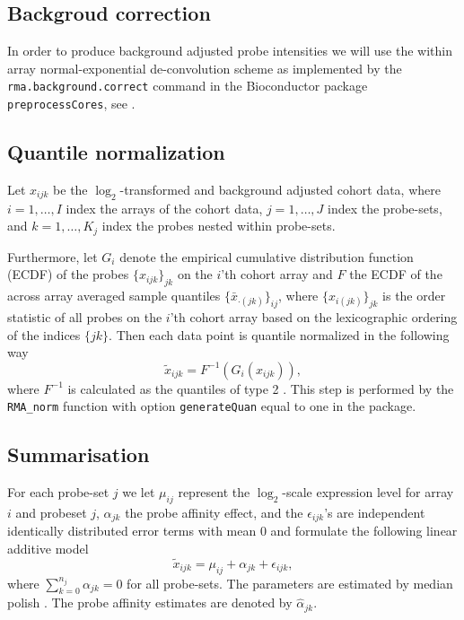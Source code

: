 \subsection{Backgroud correction}
In order to produce background adjusted probe intensities we will use the within array normal-exponential de-convolution scheme as implemented by the \texttt{rma.background.correct} command in the Bioconductor package \texttt{preprocessCores}, see
\citep{Irizarry2003b,Bolstad2004}.


\subsection{Quantile normalization}
Let $x_{ijk}$ be the $\log_2$-transformed and background adjusted cohort data, where $i = 1,\dots,I$ index the arrays of the cohort data, $j=1,\dots,J$  index the probe-sets, and $k=1,\dots,K_j$ index the probes nested within probe-sets.

Furthermore, let $G_i$ denote the empirical cumulative distribution function (ECDF) of the probes $\{x_{ijk}\}_{jk}$ on the $i$'th cohort array and $F$ the ECDF of the across array averaged sample quantiles $\{\bar{x}_{\cdot (jk)}\}_{ij}$, where $\{x_{i(jk)}\}_{jk}$ is the order statistic of all probes on the $i$'th cohort array based on the lexicographic ordering of the indices $\{jk\}$. Then each data point is quantile normalized in the following way
\begin{equation*}
     \tilde{x}_{ijk} = F^{-1}(G_i(x_{ijk})),
\end{equation*}
where $F^{-1}$ is calculated as the quantiles of type 2 \citep{Hyndman1996}.
This step is performed by the \texttt{RMA\_norm} function with option \texttt{generateQuan} equal to one in the  package.

\subsection{Summarisation}

For each probe-set $j$ we let $\mu_{ij}$ represent the $\log_2$-scale expression level for array $i$ and probeset $j$, $\alpha_{jk}$ the probe affinity effect, and the $\epsilon_{ijk}$'s are independent identically distributed  error terms with mean 0 and formulate the following linear additive model
\begin{equation*}
   \tilde{x}_{ijk} = \mu_{ij} + \alpha_{jk}+ \epsilon_{ijk},
\end{equation*}
where $\sum_{k=0}^{n_j} \alpha_{jk} = 0$ for all probe-sets. The parameters are estimated by median polish \citep{Holder2001}. The probe affinity estimates are denoted by $\hat{\alpha}_{jk}$.

